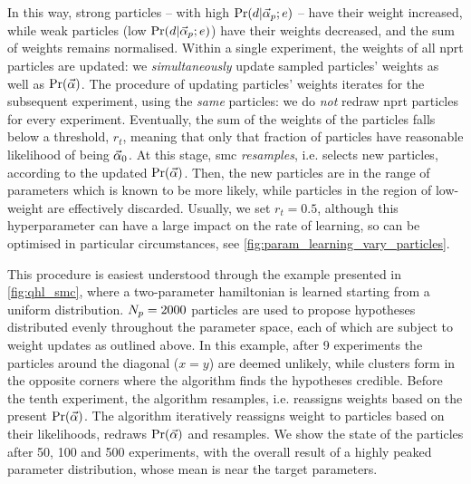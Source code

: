In this way, strong \glspl{particle} -- with high $\Pr(d | \vec{\alpha}_p; e)$ -- have their weight increased, 
    while weak \glspl{particle} (low $\Pr(d | \vec{\alpha}_p; e)$) have their weights decreased, 
    and the sum of weights remains normalised. 
Within a single experiment, the weights of all \gls{nprt} \glspl{particle} are updated:
    we \emph{simultaneously} update sampled \glspl{particle}' weights as well as $\Pr(\vec{\alpha})$. 
The procedure of updating \glspl{particle}' weights iterates for the subsequent experiment, using the \emph{same} \glspl{particle}: 
    we do \emph{not} redraw \gls{nprt} \glspl{particle} for every experiment.
Eventually, the sum of the weights of the \glspl{particle} falls below a threshold, $r_t$, 
    meaning that only that fraction of \glspl{particle} have reasonable \gls{likelihood} of being $\vec{\alpha}_0$.
At this stage, \gls{smc} \emph{resamples}\footnotemark, i.e. selects new \glspl{particle}, according to the updated $\Pr(\vec{\alpha})$.
Then, the new \glspl{particle} are in the range of parameters which is known to be more likely, 
    while \glspl{particle} in the region of low-weight are effectively discarded. 
Usually, we set $r_t=0.5$, although this \gls{hyperparameter} can have a large impact 
    on the rate of learning, so can be optimised in particular circumstances, 
    see \cref{fig:param_learning_vary_particles}.
\par 
This procedure is easiest understood through the example presented in \cref{fig:qhl_smc}, 
    where a two-parameter \gls{hamiltonian} is learned starting from a uniform distribution. 
$N_p=2000$ \glspl{particle} are used to propose hypotheses distributed evenly throughout the parameter space, 
    each of which are subject to weight updates as outlined above. 
In this example, after 9 \glspl{experiment} the \glspl{particle} around the diagonal ($x=y$) are deemed unlikely, 
    while clusters form in the opposite corners where the algorithm finds the hypotheses credible. 
Before the tenth experiment, the algorithm resamples, i.e. reassigns weights based on the present $\Pr(\vec{\alpha})$. 
The algorithm iteratively reassigns weight to \glspl{particle} based on their likelihoods, redraws $\Pr(\vec{\alpha})$ and resamples. 
We show the state of the \glspl{particle} after 50, 100 and 500 \glspl{experiment},
    with the overall result of a highly peaked parameter distribution, 
    whose mean is near the target parameters. 


